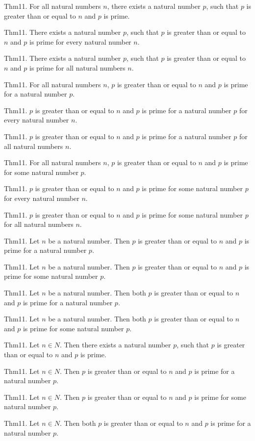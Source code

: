 \documentclass{article}
\begin{document}
Thm11. For all natural numbers $n$, there exists a natural number $p$, such that $p$ is greater than or equal to $n$ and $p$ is prime.

Thm11. There exists a natural number $p$, such that $p$ is greater than or equal to $n$ and $p$ is prime for every natural number $n$.

Thm11. There exists a natural number $p$, such that $p$ is greater than or equal to $n$ and $p$ is prime for all natural numbers $n$.

Thm11. For all natural numbers $n$, $p$ is greater than or equal to $n$ and $p$ is prime for a natural number $p$.

Thm11. $p$ is greater than or equal to $n$ and $p$ is prime for a natural number $p$ for every natural number $n$.

Thm11. $p$ is greater than or equal to $n$ and $p$ is prime for a natural number $p$ for all natural numbers $n$.

Thm11. For all natural numbers $n$, $p$ is greater than or equal to $n$ and $p$ is prime for some natural number $p$.

Thm11. $p$ is greater than or equal to $n$ and $p$ is prime for some natural number $p$ for every natural number $n$.

Thm11. $p$ is greater than or equal to $n$ and $p$ is prime for some natural number $p$ for all natural numbers $n$.

Thm11. Let $n$ be a natural number. Then $p$ is greater than or equal to $n$ and $p$ is prime for a natural number $p$.

Thm11. Let $n$ be a natural number. Then $p$ is greater than or equal to $n$ and $p$ is prime for some natural number $p$.

Thm11. Let $n$ be a natural number. Then both $p$ is greater than or equal to $n$ and $p$ is prime for a natural number $p$.

Thm11. Let $n$ be a natural number. Then both $p$ is greater than or equal to $n$ and $p$ is prime for some natural number $p$.

Thm11. Let $n \in N$. Then there exists a natural number $p$, such that $p$ is greater than or equal to $n$ and $p$ is prime.

Thm11. Let $n \in N$. Then $p$ is greater than or equal to $n$ and $p$ is prime for a natural number $p$.

Thm11. Let $n \in N$. Then $p$ is greater than or equal to $n$ and $p$ is prime for some natural number $p$.

Thm11. Let $n \in N$. Then both $p$ is greater than or equal to $n$ and $p$ is prime for a natural number $p$.
\end{document}
